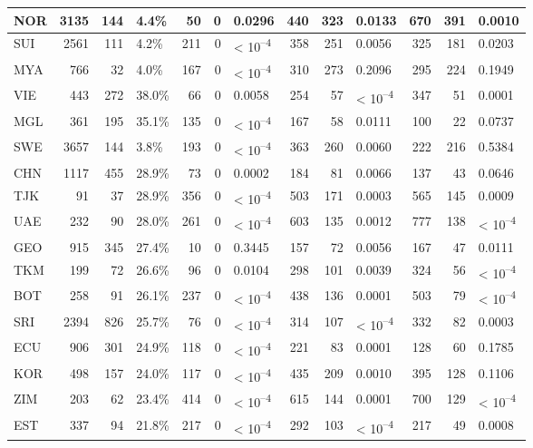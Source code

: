 \begin{tabular}{l|r|r|l|r|r|l|r|r|l|r|r|l}
\hline
NOR & 3135 & 144 & 4.4\% & 50 & 0 & 0.0296 & 440 & 323 & 0.0133 & 670 & 391 & 0.0010\\
\hline
SUI & 2561 & 111 & 4.2\% & 211 & 0 & < 10\textsuperscript{--4} & 358 & 251 & 0.0056 & 325 & 181 & 0.0203\\
\hline
MYA & 766 & 32 & 4.0\% & 167 & 0 & < 10\textsuperscript{--4} & 310 & 273 & 0.2096 & 295 & 224 & 0.1949\\
\hline
VIE & 443 & 272 & 38.0\% & 66 & 0 & 0.0058 & 254 & 57 & < 10\textsuperscript{--4} & 347 & 51 & 0.0001\\
\hline
MGL & 361 & 195 & 35.1\% & 135 & 0 & < 10\textsuperscript{--4} & 167 & 58 & 0.0111 & 100 & 22 & 0.0737\\
\hline
SWE & 3657 & 144 & 3.8\% & 193 & 0 & < 10\textsuperscript{--4} & 363 & 260 & 0.0060 & 222 & 216 & 0.5384\\
\hline
CHN & 1117 & 455 & 28.9\% & 73 & 0 & 0.0002 & 184 & 81 & 0.0066 & 137 & 43 & 0.0646\\
\hline
TJK & 91 & 37 & 28.9\% & 356 & 0 & < 10\textsuperscript{--4} & 503 & 171 & 0.0003 & 565 & 145 & 0.0009\\
\hline
UAE & 232 & 90 & 28.0\% & 261 & 0 & < 10\textsuperscript{--4} & 603 & 135 & 0.0012 & 777 & 138 & < 10\textsuperscript{--4}\\
\hline
GEO & 915 & 345 & 27.4\% & 10 & 0 & 0.3445 & 157 & 72 & 0.0056 & 167 & 47 & 0.0111\\
\hline
TKM & 199 & 72 & 26.6\% & 96 & 0 & 0.0104 & 298 & 101 & 0.0039 & 324 & 56 & < 10\textsuperscript{--4}\\
\hline
BOT & 258 & 91 & 26.1\% & 237 & 0 & < 10\textsuperscript{--4} & 438 & 136 & 0.0001 & 503 & 79 & < 10\textsuperscript{--4}\\
\hline
SRI & 2394 & 826 & 25.7\% & 76 & 0 & < 10\textsuperscript{--4} & 314 & 107 & < 10\textsuperscript{--4} & 332 & 82 & 0.0003\\
\hline
ECU & 906 & 301 & 24.9\% & 118 & 0 & < 10\textsuperscript{--4} & 221 & 83 & 0.0001 & 128 & 60 & 0.1785\\
\hline
KOR & 498 & 157 & 24.0\% & 117 & 0 & < 10\textsuperscript{--4} & 435 & 209 & 0.0010 & 395 & 128 & 0.1106\\
\hline
ZIM & 203 & 62 & 23.4\% & 414 & 0 & < 10\textsuperscript{--4} & 615 & 144 & 0.0001 & 700 & 129 & < 10\textsuperscript{--4}\\
\hline
EST & 337 & 94 & 21.8\% & 217 & 0 & < 10\textsuperscript{--4} & 292 & 103 & < 10\textsuperscript{--4} & 217 & 49 & 0.0008\\

\end{tabular}
